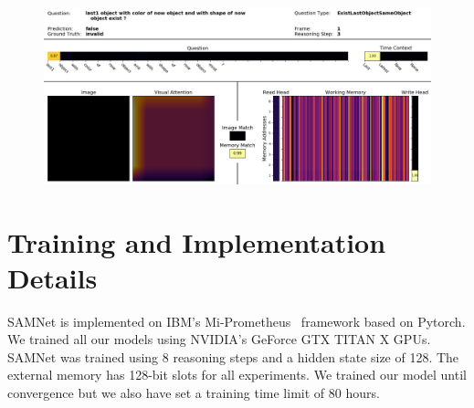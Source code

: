 \begin{figure}
	\includegraphics[width=\textwidth]{img/image}
	\label{fig:model}
\end{figure}	






\section{Training and Implementation Details}

SAMNet is implemented on IBM's Mi-Prometheus~\cite{kornuta2018accelerating} framework based on Pytorch. 
We trained all our models using NVIDIA’s GeForce GTX TITAN X GPUs. SAMNet was trained using 8 reasoning steps and a hidden state size of 128. The external memory has 128-bit slots for all experiments. We trained our model until convergence but we also have set a training time limit of 80 hours.


